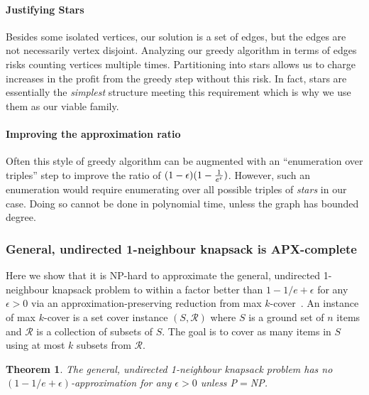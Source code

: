 \documentclass[12pt]{article}
\newtheorem{theorem}{Theorem}
\begin{document}
\paragraph{Justifying Stars}

Besides some isolated vertices, our solution is a set of edges, but
the edges are not necessarily vertex disjoint.  Analyzing our greedy
algorithm in terms of edges risks counting vertices multiple times.
Partitioning into stars allows us to charge increases in the profit
from the greedy step without this risk.  In fact, stars are
essentially the {\em simplest} structure meeting this requirement
which is why we use them as our viable family.

\paragraph{Improving the approximation ratio}

Often this style of greedy algorithm can be augmented with an
``enumeration over triples'' step to improve the ratio of
$(1-\epsilon)(1-{1\over e^\epsilon})$.  However, such an enumeration
would require enumerating over all possible triples of {\em stars} in
our case.  Doing so cannot be done in polynomial time, unless the
graph has bounded degree.



\subsubsection{General, undirected 1-neighbour knapsack is APX-complete} \label{sec:apx-hardness}











Here we show that it is NP-hard to approximate the general, undirected 1-neighbour knapsack problem to within a factor better than $1-1/e+\epsilon$ for any $\epsilon > 0$ via an approximation-preserving reduction from max $k$-cover~\cite{feige:jacm1998}.  An instance of max $k$-cover is a set cover instance $(S,{\mathcal R})$ where $S$ is a ground set of $n$ items and $\mathcal R$ is a collection of subsets of $S$.  The goal is to cover
as many items in $S$ using at most $k$ subsets from $\mathcal R$.

\begin{theorem}
The general, undirected 1-neighbour knapsack problem has no $(1-1/e+\epsilon)$-approximation for any $\epsilon > 0$ unless P$=$NP.
\end{theorem}
\end{document}

